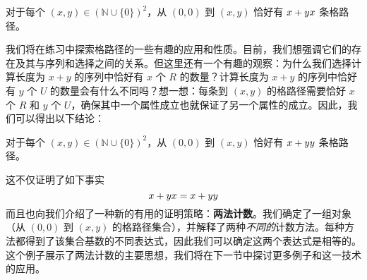 \begin{example}
    \begin{proposition}
        对于每个 $(x,y) \in (\mathbb{N} \cup \{0\})^2$，从 $(0,0)$ 到 $(x,y)$ 恰好有 ${
                    x+y \\x
                }$ 条格路径。
    \end{proposition}

    我们将在练习中探索格路径的一些有趣的应用和性质。目前，我们想强调它们的存在及其与序列和选择之间的关系。但这里还有一个有趣的观察：为什么我们选择计算长度为 $x+y$ 的序列中恰好有 $x$ 个 $R$ 的数量？计算长度为 $x+y$ 的序列中恰好有 $y$ 个 $U$ 的数量会有什么不同吗？想一想：每条到 $(x, y)$ 的格路径需要恰好 $x$ 个 $R$ 和 $y$ 个 $U$，确保其中一个属性成立也就保证了另一个属性的成立。因此，我们可以得出以下结论：

    \begin{proposition}
        对于每个 $(x,y) \in (\mathbb{N} \cup \{0\})^2$，从 $(0,0)$ 到 $(x,y)$ 恰好有 ${
                    x+y \\y
                }$ 条格路径。
    \end{proposition}

    这不仅证明了如下事实
    \[{x+y \\x} = {x+y \\y}\]
    而且也向我们介绍了一种新的有用的证明策略：\textbf{两法计数}。我们确定了一组对象（从 $(0, 0)$ 到 $(x, y)$ 的格路径集合），并解释了两种\emph{不同的}计数方法。每种方法都得到了该集合基数的不同表达式，因此我们可以确定这两个表达式是相等的。这个例子展示了两法计数的主要思想，我们将在下一节中探讨更多例子和这一技术的应用。
\end{example}